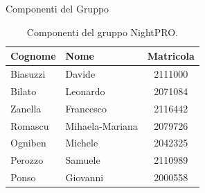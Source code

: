 \documentclass[a4paper, 11pt, oneside]{scrartcl} %
\begin{document}
\newpage

{Componenti del Gruppo}

\begin{table}[h!]
\centering
\renewcommand{\arraystretch}{1.2} %
\begin{tabular}{@{}llc@{}}
\toprule
\textbf{Cognome} & \textbf{Nome} & \textbf{Matricola} \\
\midrule
Biasuzzi & Davide & 2111000 \\
Bilato & Leonardo & 2071084 \\
Zanella & Francesco & 2116442 \\
Romascu & Mihaela-Mariana & 2079726 \\
Ogniben & Michele & 2042325 \\
Perozzo & Samuele & 2110989 \\
Ponso & Giovanni & 2000558 \\
\bottomrule
\end{tabular}
\caption{Componenti del gruppo NightPRO.}
\end{table}
\end{document}
